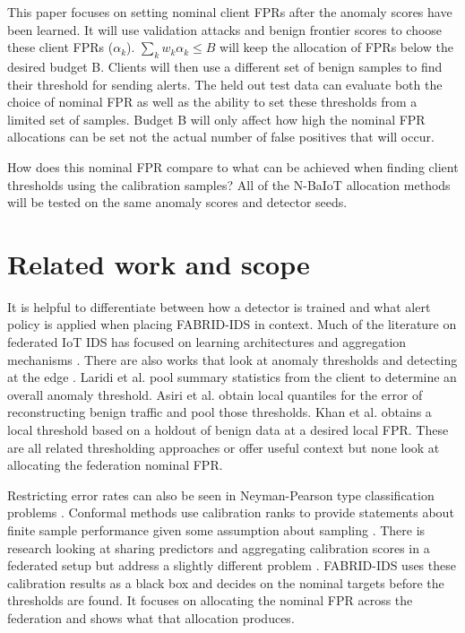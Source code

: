 \documentclass[pdflatex,sn-mathphys-num]{sn-jnl}
\begin{document}
This paper focuses on setting nominal client FPRs after the anomaly scores have been learned. It will use validation attacks and benign frontier scores to choose these client FPRs ($\alpha_k$). $\sum_k w_k\alpha_k\leq B$ will keep the allocation of FPRs below the desired budget B. Clients will then use a different set of benign samples to find their threshold for sending alerts. The held out test data can evaluate both the choice of nominal FPR as well as the ability to set these thresholds from a limited set of samples. Budget B will only affect how high the nominal FPR allocations can be set not the actual number of false positives that will occur.

How does this nominal FPR compare to what can be achieved when finding client thresholds using the calibration samples? All of the N-BaIoT allocation methods will be tested on the same anomaly scores and detector seeds.

\section{Related work and scope}\label{sec:related}
It is helpful to differentiate between how a detector is trained and what alert policy is applied when placing FABRID-IDS in context. Much of the literature on federated IoT IDS has focused on learning architectures and aggregation mechanisms \cite{nguyen2019diot,wang2021noniid,hamdi2023flids,kairouz2021advances}. There are also works that look at anomaly thresholds and detecting at the edge \cite{bridges2017threshold,ochiai2023global}. Laridi et al. \cite{laridi2024threshold} pool summary statistics from the client to determine an overall anomaly threshold. Asiri et al. \cite{Asiri2025Decentralized} obtain local quantiles for the error of reconstructing benign traffic and pool those thresholds. Khan et al. \cite{Khan2026FedDTCN} obtains a local threshold based on a holdout of benign data at a desired local FPR. These are all related thresholding approaches or offer useful context but none look at allocating the federation nominal FPR.

Restricting error rates can also be seen in Neyman-Pearson type classification problems \cite{tong2018np}. Conformal methods use calibration ranks to provide statements about finite sample performance given some assumption about sampling \cite{angelopoulos2023gentle}. There is research looking at sharing predictors and aggregating calibration scores in a federated setup but address a slightly different problem \cite{prism2026fcp}. FABRID-IDS uses these calibration results as a black box and decides on the nominal targets before the thresholds are found. It focuses on allocating the nominal FPR across the federation and shows what that allocation produces.
\end{document}
